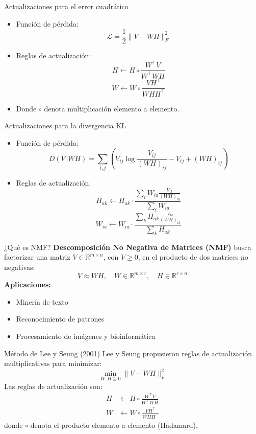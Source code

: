\documentclass{beamer}
\begin{document}
\begin{frame}{Actualizaciones para el error cuadrático}
\begin{itemize}
    \item Función de pérdida:
    \[
    \mathcal{L} = \frac{1}{2} \| V - WH \|_F^2
    \]
    \item Reglas de actualización:
    \[
    H \leftarrow H \circ \frac{W^\top V}{W^\top W H}
    \]
    \[
    W \leftarrow W \circ \frac{V H^\top}{W H H^\top}
    \]
    \item Donde \( \circ \) denota multiplicación elemento a elemento.
\end{itemize}
\end{frame}

\begin{frame}{Actualizaciones para la divergencia KL}
\begin{itemize}
    \item Función de pérdida:
    \[
    D(V \Vert WH) = \sum_{i,j} \left( V_{ij} \log \frac{V_{ij}}{(WH)_{ij}} - V_{ij} + (WH)_{ij} \right)
    \]
    \item Reglas de actualización:
    \[
    H_{ak} \leftarrow H_{ak} \cdot \frac{\sum_i W_{ia} \frac{V_{ik}}{(WH)_{ik}}}{\sum_i W_{ia}}
    \]
    \[
    W_{ia} \leftarrow W_{ia} \cdot \frac{\sum_k H_{ak} \frac{V_{ik}}{(WH)_{ik}}}{\sum_k H_{ak}}
    \]
\end{itemize}
\end{frame}


\begin{frame}{¿Qué es NMF?}
    \textbf{Descomposición No Negativa de Matrices (NMF)} busca factorizar una matriz \( V \in \mathbb{R}^{m \times n} \), con \( V \geq 0 \), en el producto de dos matrices no negativas:
    \[
        V \approx WH, \quad W \in \mathbb{R}^{m \times r}, \quad H \in \mathbb{R}^{r \times n}
    \]
    \pause
    \textbf{Aplicaciones:}
    \begin{itemize}
        \item Minería de texto
        \item Reconocimiento de patrones
        \item Procesamiento de imágenes y bioinformática
    \end{itemize}
\end{frame}

\begin{frame}{Método de Lee y Seung (2001)}
    Lee y Seung propusieron reglas de actualización multiplicativas para minimizar:
    \[
        \min_{W,H \geq 0} \| V - WH \|_F^2
    \]
    Las reglas de actualización son:
    \begin{align*}
        H &\leftarrow H \circ \frac{W^\top V}{W^\top WH} \\
        W &\leftarrow W \circ \frac{V H^\top}{WHH^\top}
    \end{align*}
    donde \( \circ \) denota el producto elemento a elemento (Hadamard).
\end{frame}
\end{document}
